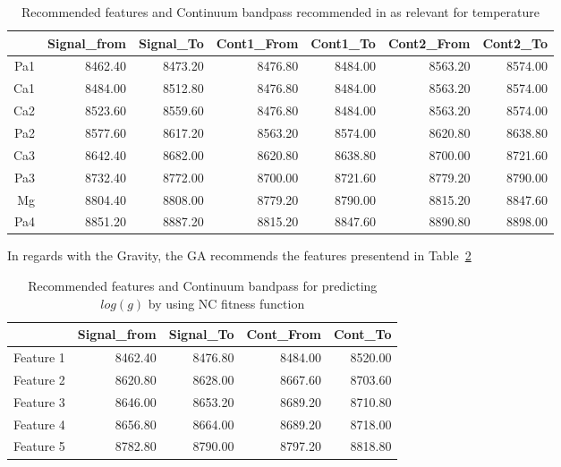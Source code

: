 {\begin{table}
\begin{center}
\begin{tabular}{rrrrrrr}
  \hline
 & Signal\_from & Signal\_To & Cont1\_From & Cont1\_To & Cont2\_From & Cont2\_To \\ 
  \hline
Pa1 & 8462.40 & 8473.20 & 8476.80 & 8484.00 & 8563.20 & 8574.00 \\ 
  Ca1 & 8484.00 & 8512.80 & 8476.80 & 8484.00 & 8563.20 & 8574.00 \\ 
  Ca2 & 8523.60 & 8559.60 & 8476.80 & 8484.00 & 8563.20 & 8574.00 \\ 
  Pa2 & 8577.60 & 8617.20 & 8563.20 & 8574.00 & 8620.80 & 8638.80 \\ 
  Ca3 & 8642.40 & 8682.00 & 8620.80 & 8638.80 & 8700.00 & 8721.60 \\ 
  Pa3 & 8732.40 & 8772.00 & 8700.00 & 8721.60 & 8779.20 & 8790.00 \\ 
  Mg & 8804.40 & 8808.00 & 8779.20 & 8790.00 & 8815.20 & 8847.60 \\ 
  Pa4 & 8851.20 & 8887.20 & 8815.20 & 8847.60 & 8890.80 & 8898.00 \\ 
   \hline
\end{tabular}
\caption {Recommended features and Continuum bandpass recommended in 
   \cite{2013A&A...549A.129C} as relevant for temperature}
   \label{tab:tab_cesetti} 
\end{center}
\end{table}

In regards with the Gravity, the GA recommends the features 
presentend in Table~\ref{tab:tab_NC_G}

\begin{table}
\begin{center}
\begin{tabular}{rrrrr}
  \hline
 & Signal\_from & Signal\_To & Cont\_From & Cont\_To \\ 
  \hline
Feature 1 & 8462.40 & 8476.80 & 8484.00 & 8520.00 \\ 
Feature 2 & 8620.80 & 8628.00 & 8667.60 & 8703.60 \\ 
Feature 3 & 8646.00 & 8653.20 & 8689.20 & 8710.80 \\ 
Feature 4 & 8656.80 & 8664.00 & 8689.20 & 8718.00 \\ 
Feature 5 & 8782.80 & 8790.00 & 8797.20 & 8818.80 \\ 
   \hline
\end{tabular}
\caption {Recommended features and Continuum bandpass for predicting $log(g)$ 
      by using NC fitness function} \label{tab:tab_NC_G} 
\end{center}
\end{table}

}

